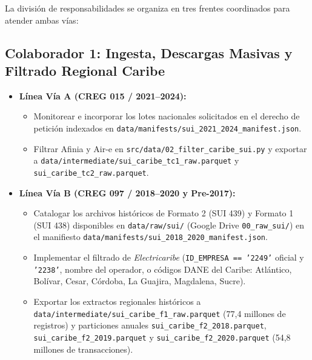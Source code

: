 \documentclass[11pt,a4paper]{article}
\begin{document}
La división de responsabilidades se organiza en tres frentes coordinados para atender ambas vías:

\subsection{Colaborador 1: Ingesta, Descargas Masivas y Filtrado Regional Caribe}
\begin{itemize}
    \item \textbf{Línea Vía A (CREG 015 / 2021--2024):}
    \begin{itemize}
        \item Monitorear e incorporar los lotes nacionales solicitados en el derecho de petición indexados en \texttt{data/manifests/sui\_2021\_2024\_manifest.json}.
        \item Filtrar Afinia y Air-e en \texttt{src/data/02\_filter\_caribe\_sui.py} y exportar a \texttt{data/intermediate/sui\_caribe\_tc1\_raw.parquet} y \texttt{sui\_caribe\_tc2\_raw.parquet}.
    \end{itemize}
    \item \textbf{Línea Vía B (CREG 097 / 2018--2020 y Pre-2017):}
    \begin{itemize}
        \item Catalogar los archivos históricos de Formato 2 (SUI 439) y Formato 1 (SUI 438) disponibles en \texttt{data/raw/sui/} (Google Drive \texttt{00\_raw\_sui/}) en el manifiesto \texttt{data/manifests/sui\_2018\_2020\_manifest.json}.
        \item Implementar el filtrado de \textit{Electricaribe} (\texttt{ID\_EMPRESA == '2249'} oficial y \texttt{'2238'}, nombre del operador, o códigos DANE del Caribe: Atlántico, Bolívar, Cesar, Córdoba, La Guajira, Magdalena, Sucre).
        \item Exportar los extractos regionales históricos a \texttt{data/intermediate/sui\_caribe\_f1\_raw.parquet} (77,4 millones de registros) y particiones anuales \texttt{sui\_caribe\_f2\_2018.parquet}, \texttt{sui\_caribe\_f2\_2019.parquet} y \texttt{sui\_caribe\_f2\_2020.parquet} (54,8 millones de transacciones).
    \end{itemize}
\end{itemize}
\end{document}
